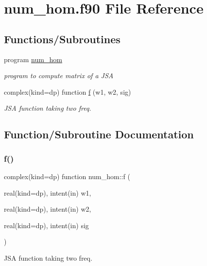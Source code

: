 \hypertarget{num__hom_8f90}{}\section{num\+\_\+hom.\+f90 File Reference}
\label{num__hom_8f90}
\subsection*{Functions/\+Subroutines}
\begin{DoxyCompactItemize}
\item 
program \hyperlink{num__hom_8f90_a7dae3af56c12300a9c9fb1deb246e6e7}{num\+\_\+hom}
\begin{DoxyCompactList}\small\item\em program to compute matrix of a J\+SA \end{DoxyCompactList}\item 
complex(kind=dp) function \hyperlink{num__hom_8f90_a2ea4612463aead6dff28d647f3800909}{f} (w1, w2, sig)
\begin{DoxyCompactList}\small\item\em J\+SA function taking two freq. \end{DoxyCompactList}\end{DoxyCompactItemize}


\subsection{Function/\+Subroutine Documentation}
\mbox{\label{num__hom_8f90_a2ea4612463aead6dff28d647f3800909}} 
\subsubsection{\texorpdfstring{f()}{f()}}
{\footnotesize\ttfamily complex(kind=dp) function num\+\_\+hom\+::f (\begin{DoxyParamCaption}\item[{real(kind=dp), intent(in)}]{w1,  }\item[{real(kind=dp), intent(in)}]{w2,  }\item[{real(kind=dp), intent(in)}]{sig }\end{DoxyParamCaption})}



J\+SA function taking two freq. 


